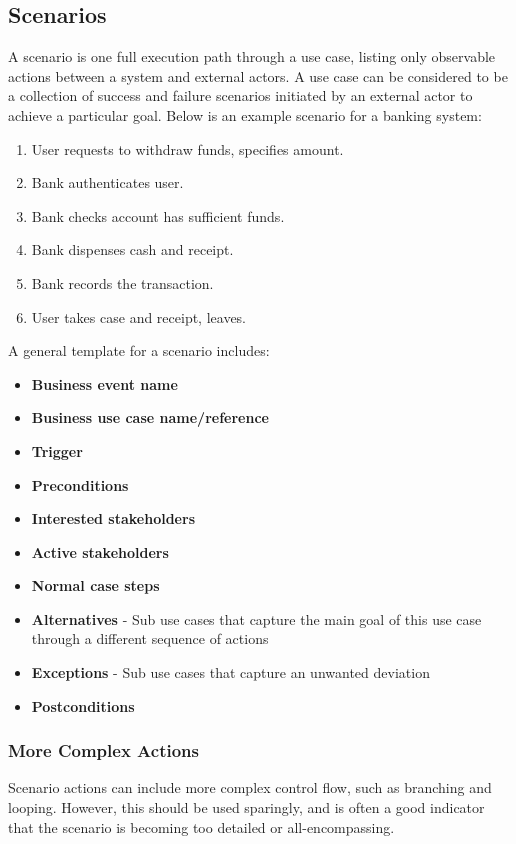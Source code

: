 \documentclass[12pt,titlepage]{article}
\begin{document}
    \subsection{Scenarios}
      A scenario is one full execution path through a use case, listing only observable actions between a system and external actors. A use case can
      be considered to be a collection of success and failure scenarios initiated by an external actor to achieve a particular goal. Below is an example
      scenario for a banking system:
      \begin{enumerate}
        \item User requests to withdraw funds, specifies amount.
        \item Bank authenticates user.
        \item Bank checks account has sufficient funds.
        \item Bank dispenses cash and receipt.
        \item Bank records the transaction.
        \item User takes case and receipt, leaves.
      \end{enumerate}

      A general template for a scenario includes:
      \begin{itemize}
        \item \textbf{Business event name}
        \item \textbf{Business use case name/reference}
        \item \textbf{Trigger}
        \item \textbf{Preconditions}
        \item \textbf{Interested stakeholders}
        \item \textbf{Active stakeholders}
        \item \textbf{Normal case steps}
        \item \textbf{Alternatives} - Sub use cases that capture the main goal of this use case through a different sequence of actions
        \item \textbf{Exceptions} - Sub use cases that capture an unwanted deviation
        \item \textbf{Postconditions}
      \end{itemize}

      \subsubsection{More Complex Actions}
        Scenario actions can include more complex control flow, such as branching and looping. However, this should be used sparingly, and is
        often a good indicator that the scenario is becoming too detailed or all-encompassing.
\end{document}
